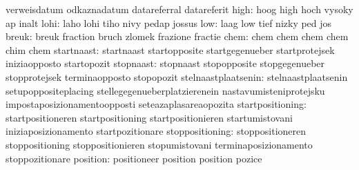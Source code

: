                                   verweisdatum                     odkaznadatum
                                  datareferral                     datareferit
                            high: hoog                             high
                                  hoch                             vysoky
                                  ap                               inalt
                            lohi: laho                             lohi
                                  tiho                             nivy
                                  pedap                            jossus
                             low: laag                             low
                                  tief                             nizky
                                  ped                              jos
                           breuk: breuk                            fraction
                                  bruch                            zlomek
                                  frazione                         fractie
                            chem: chem                             chem
                                  chem                             chem
                                  chim                             chem
                      startnaast: startnaast                       startopposite
                                  startgegenueber                  startprotejsek
                                  iniziaopposto                    startopozit
                       stopnaast: stopnaast                        stopopposite
                                  stopgegenueber                   stopprotejsek
                                  terminaopposto                   stopopozit
             stelnaastplaatsenin: stelnaastplaatsenin              setupoppositeplacing
                                  stellegegenueberplatzierenein    nastavumisteniprotejsku
                                  impostaposizionamentoopposti     seteazaplasareaopozita
                startpositioning: startpositioneren                startpositioning
                                  startpositionieren               startumistovani
                                  iniziaposizionamento             startpozitionare
                 stoppositioning: stoppositioneren                 stoppositioning
                                  stoppositionieren                stopumistovani
                                  terminaposizionamento            stoppozitionare
                        position: positioneer                      position
                                  position                         pozice
